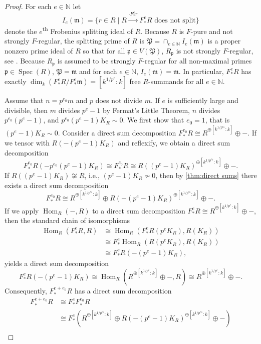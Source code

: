 \documentclass[reqno,11pt]{amsart}
\numberwithin{equation}{section}
\theoremstyle{definition}
\theoremstyle{definition}
\theoremstyle{definition}
\theoremstyle{remark}
\newcommand{\Spec}{\operatorname{Spec}}
\newcommand{\ts}{\textsuperscript}
\newcommand{\Hom}{\operatorname{Hom}}
\newcommand{\NN}{\mathbb{N}}
\newcommand{\fm}{\mathfrak{m}}
\newcommand{\fp}{\mathfrak{p}}
\newcommand{\fP}{\mathfrak{P}}
\begin{document}
\begin{proof}
    For each $e\in\NN$ let
    \[
    I_e(\fm) = \{r\in R\mid R\xrightarrow{\cdot F^e_*r}F^e_*R\mbox{ does not split}\} 
    \]
    denote the $e$\ts{th} Frobenius splitting ideal of $R$. Because $R$ is $F$-pure and not strongly $F$-regular, the splitting prime of $R$ is $\fP = \cap_{e\in \NN}I_e(\fm)$ is a proper nonzero prime ideal of $R$ so that for all $\fp\in V(\fP)$, $R_{\fp}$ is not strongly $F$-regular, see \cite[Theorem~3.3, Corollary~3.4, and Proposition~3.6]{AE05}. Because $R_{\fp}$ is assumed to be strongly $F$-regular for all non-maximal primes $\fp\in\Spec(R)$, $\fP = \fm$ and for each $e\in\NN$, $I_e(\fm) = \fm$. In particular, $F^e_*R$ has exactly $\dim_k(F^e_*R/F^e_*\fm) = [k^{1/p^{e}}:k]$ free $R$-summands for all $e\in\NN$. 
    
    Assume that $n = p^{e_0}m$ and $p$ does not divide $m$. If $e$ is sufficiently large and divisible, then $m$ divides $p^e-1$ by Fermat's Little Theorem, $n$ divides $p^{e_0}(p^e-1)$, and $p^{e_0}(p^e-1)K_R\sim 0$. We first show that $e_0=1$, that is $(p^e-1)K_R\sim 0$. Consider a direct sum decomposition $F^{e_0}_*R\cong R^{\oplus [k^{1/p^{e_0}}:k]}\oplus -$. If we tensor with $R(-(p^e-1)K_R)$ and reflexify, we obtain a direct sum decomposition
    \[
    F^{e_0}_*R(-p^{e_0}(p^e-1)K_R)\cong F^{e_0}_*R\cong R((p^e-1)K_R)^{\oplus [k^{1/p^{e_0}}:k]}\oplus -.
    \]
    If $R((p^e-1)K_R)\not\cong R$, i.e., $(p^e-1)K_R\not\sim 0$, then by \cref{thm:direct sums} there exists a direct sum decomposition
    \[
    F^{e_0}_*R\cong R^{\oplus [k^{1/p^{e_0}}:k]}\oplus R(-(p^e-1)K_R)^{\oplus [k^{1/p^{e_0}}:k]}\oplus -.
    \]
    If we apply $\Hom_R(-,R)$ to a direct sum decomposition $F^e_*R\cong R^{\oplus [k^{1/p^{e}}:k]}\oplus -$, then the standard chain of isomorphisms
    \begin{align*}
        \Hom_R(F^e_*R,R) &\cong \Hom_R(F^e_*R(p^eK_R),R(K_R))\\
        & \cong F^e_*\Hom_R(R(p^eK_R), R(K_R))\\
        & \cong F^e_*R(-(p^e-1)K_R),
    \end{align*}
    yields a direct sum decomposition
    \[
    F^e_*R(-(p^e-1)K_R) \cong  \Hom_R(R^{\oplus [k^{1/p^{e}}:k]}\oplus -, R) \cong R^{\oplus [k^{1/p^{e}}:k]}\oplus -.
    \]
    Consequently, $F^{e+e_0}_*R$ has a direct sum decomposition
    \begin{align*}
        F^{e+e_0}_*R & \cong F^e_*F^{e_0}_*R \\
        & \cong F^e_*\left(R^{\oplus [k^{1/p^{e_0}}:k]}\oplus R(-(p^e-1)K_R)^{\oplus [k^{1/p^{e_0}}:k]}\oplus -\right) \\

\end{align*}
\end{proof}
\end{document}
